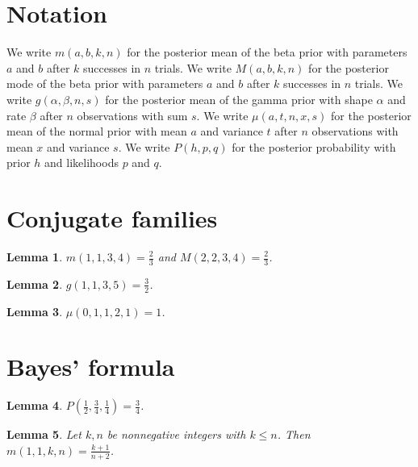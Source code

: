 \documentclass{article}
\newtheorem{lemma}{Lemma}
\begin{document}
\section{Notation}

We write $m(a,b,k,n)$ for the posterior mean of the beta prior with parameters $a$ and $b$ after $k$ successes in $n$ trials.
We write $M(a,b,k,n)$ for the posterior mode of the beta prior with parameters $a$ and $b$ after $k$ successes in $n$ trials.
We write $g(\alpha,\beta,n,s)$ for the posterior mean of the gamma prior with shape $\alpha$ and rate $\beta$ after $n$ observations with sum $s$.
We write $\mu(a,t,n,x,s)$ for the posterior mean of the normal prior with mean $a$ and variance $t$ after $n$ observations with mean $x$ and variance $s$.
We write $P(h,p,q)$ for the posterior probability with prior $h$ and likelihoods $p$ and $q$.

\section{Conjugate families}

\begin{lemma}\label{beta}
$m(1,1,3,4)=\frac23$ and $M(2,2,3,4)=\frac23$.
\end{lemma}

\begin{lemma}\label{gamma}
$g(1,1,3,5)=\frac32$.
\end{lemma}

\begin{lemma}\label{normal}
$\mu(0,1,1,2,1)=1$.
\end{lemma}

\section{Bayes' formula}

\begin{lemma}\label{bayes}
$P(\frac12,\frac34,\frac14)=\frac34$.
\end{lemma}

\begin{lemma}\label{uniform}
Let $k,n$ be nonnegative integers with $k\le n$. Then $m(1,1,k,n)=\frac{k+1}{n+2}$.
\end{lemma}
\end{document}
